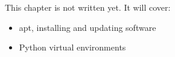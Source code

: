 \label{ch:linux3}
\begin{keyidea}
This chapter is not written yet. It will cover:
\begin{itemize}[nosep]
  \item apt, installing and updating software
  \item Python virtual environments
\end{itemize}
\end{keyidea}
